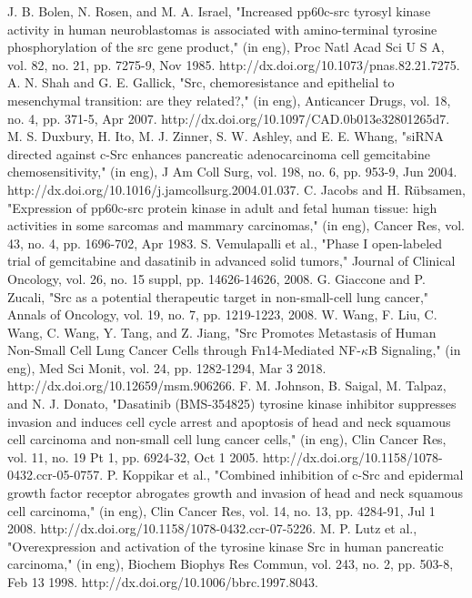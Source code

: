 \documentclass[5p,,preprint,12pt]{elsarticle}
\begin{document}
\begin{thebibliography}{71}
	J. B. Bolen, N. Rosen, and M. A. Israel, "Increased pp60c-src tyrosyl kinase activity in human neuroblastomas is associated with amino-terminal tyrosine phosphorylation of the src gene product," (in eng), Proc Natl Acad Sci U S A, vol. 82, no. 21, pp. 7275-9, Nov 1985. http://dx.doi.org/10.1073/pnas.82.21.7275.
	A. N. Shah and G. E. Gallick, "Src, chemoresistance and epithelial to mesenchymal transition: are they related?," (in eng), Anticancer Drugs, vol. 18, no. 4, pp. 371-5, Apr 2007. http://dx.doi.org/10.1097/CAD.0b013e32801265d7.
	M. S. Duxbury, H. Ito, M. J. Zinner, S. W. Ashley, and E. E. Whang, "siRNA directed against c-Src enhances pancreatic adenocarcinoma cell gemcitabine chemosensitivity," (in eng), J Am Coll Surg, vol. 198, no. 6, pp. 953-9, Jun 2004. http://dx.doi.org/10.1016/j.jamcollsurg.2004.01.037.
	C. Jacobs and H. Rübsamen, "Expression of pp60c-src protein kinase in adult and fetal human tissue: high activities in some sarcomas and mammary carcinomas," (in eng), Cancer Res, vol. 43, no. 4, pp. 1696-702, Apr 1983.
	S. Vemulapalli et al., "Phase I open-labeled trial of gemcitabine and dasatinib in advanced solid tumors," Journal of Clinical Oncology, vol. 26, no. 15 suppl, pp. 14626-14626, 2008.
	G. Giaccone and P. Zucali, "Src as a potential therapeutic target in non-small-cell lung cancer," Annals of Oncology, vol. 19, no. 7, pp. 1219-1223, 2008.
	W. Wang, F. Liu, C. Wang, C. Wang, Y. Tang, and Z. Jiang, "Src Promotes Metastasis of Human Non-Small Cell Lung Cancer Cells through Fn14-Mediated NF-$\kappa$B Signaling," (in eng), Med Sci Monit, vol. 24, pp. 1282-1294, Mar 3 2018. http://dx.doi.org/10.12659/msm.906266.
	F. M. Johnson, B. Saigal, M. Talpaz, and N. J. Donato, "Dasatinib (BMS-354825) tyrosine kinase inhibitor suppresses invasion and induces cell cycle arrest and apoptosis of head and neck squamous cell carcinoma and non-small cell lung cancer cells," (in eng), Clin Cancer Res, vol. 11, no. 19 Pt 1, pp. 6924-32, Oct 1 2005. http://dx.doi.org/10.1158/1078-0432.ccr-05-0757.
	P. Koppikar et al., "Combined inhibition of c-Src and epidermal growth factor receptor abrogates growth and invasion of head and neck squamous cell carcinoma," (in eng), Clin Cancer Res, vol. 14, no. 13, pp. 4284-91, Jul 1 2008. http://dx.doi.org/10.1158/1078-0432.ccr-07-5226.
	M. P. Lutz et al., "Overexpression and activation of the tyrosine kinase Src in human pancreatic carcinoma," (in eng), Biochem Biophys Res Commun, vol. 243, no. 2, pp. 503-8, Feb 13 1998. http://dx.doi.org/10.1006/bbrc.1997.8043.

\end{thebibliography}
\end{document}
